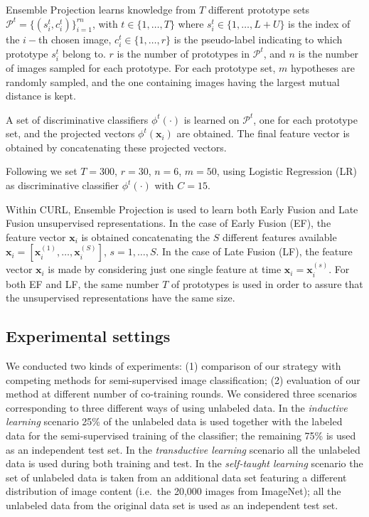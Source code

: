 \documentclass[journal,11pt]{IEEEtran}
\newcommand{\ADD}[1]{#1}
\newcommand{\coso}{strategy}
\begin{document}
Ensemble Projection learns knowledge from $T$ different prototype sets $\mathcal{P}^t = \{ (s_i^t,c_i^t) \}_{i=1}^{rn}$, with $ t \in \{1, \ldots, T\}$ where $s_i^t \in \{1, \ldots, L+U \}$ is the index of the $i-$th chosen image, $c_i^t \in \{1, \ldots, r \}$ is the pseudo-label indicating to which prototype $s_i^t$ belong to. $r$ is the number of prototypes
in $\mathcal{P}^t$, and $n$ is the number of images sampled for each prototype.
For each prototype set, $m$ hypotheses are randomly sampled, and the one containing images having the largest mutual distance is kept.

A set of discriminative classifiers $\phi^t(\cdot)$ is learned on $\mathcal{P}^t$, one for each prototype set, and the projected vectors $\phi^t(\mathbf{x}_i)$ are obtained. The final feature vector is obtained by concatenating these projected vectors.

Following \cite{dai2013ensemble} we set $T=300$, $r=30$, $n=6$, $m=50$, using Logistic Regression (LR) as discriminative classifier $\phi^t(\cdot)$ with $C=15$. %

\ADD{Within CURL}, Ensemble Projection is used to learn both Early Fusion and Late Fusion unsupervised representations.
In the case of Early Fusion (EF), the feature vector $\mathbf{x}_i$ is obtained concatenating the $S$ different features available $\mathbf{x}_i=[\mathbf{x}_i^{(1)},\ldots,\mathbf{x}_i^{(S)}]$, $s=1,\ldots,S$. In the case of Late Fusion (LF), the feature vector $\mathbf{x}_i$ is made by considering just one single feature at time $\mathbf{x}_i=\mathbf{x}_i^{(s)}$.
For both EF and LF, the same number $T$ of prototypes is used in order to assure that the unsupervised representations have the same size.

\subsection{Experimental settings}
We conducted two kinds of experiments: (1) comparison of our \coso{ }
with competing methods for semi-supervised image classification; (2)
evaluation of our method at different number of co-training rounds.
We considered three scenarios corresponding to three different ways of
using unlabeled data.  In the \emph{inductive learning} scenario 25\%
of the unlabeled data is used together with the labeled data for the
semi-supervised training of the classifier; the remaining 75\% is used
as an independent test set.  In the \emph{transductive learning}
scenario all the unlabeled data is used during both training and test.
In the \emph{self-taught learning} scenario the set of unlabeled data
is taken from an additional data set featuring a different
distribution of image content (i.e.~the 20,000 images from ImageNet);
all the unlabeled data from the original data set is used as an
independent test set.
\end{document}
